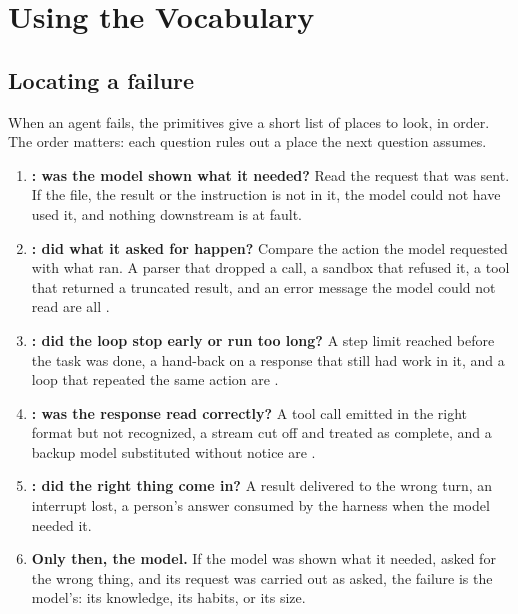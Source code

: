 \section{Using the Vocabulary}
\label{sec:uses}

\subsection{Locating a failure}
When an agent fails, the primitives give a short list of places to look, in order. The order matters: each question rules out a place the next question assumes.

\begin{enumerate}
  \item \textbf{: was the model shown what it needed?} Read the request that was sent. If the file, the result or the instruction is not in it, the model could not have used it, and nothing downstream is at fault.
  \item \textbf{: did what it asked for happen?} Compare the action the model requested with what ran. A parser that dropped a call, a sandbox that refused it, a tool that returned a truncated result, and an error message the model could not read are all .
  \item \textbf{: did the loop stop early or run too long?} A step limit reached before the task was done, a hand-back on a response that still had work in it, and a loop that repeated the same action are .
  \item \textbf{: was the response read correctly?} A tool call emitted in the right format but not recognized, a stream cut off and treated as complete, and a backup model substituted without notice are .
  \item \textbf{: did the right thing come in?} A result delivered to the wrong turn, an interrupt lost, a person's answer consumed by the harness when the model needed it.
  \item \textbf{Only then, the model.} If the model was shown what it needed, asked for the wrong thing, and its request was carried out as asked, the failure is the model's: its knowledge, its habits, or its size.
\end{enumerate}

